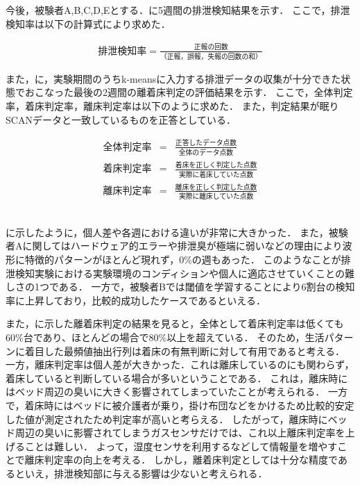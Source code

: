 今後，被験者A,B,C,D,Eとする．に5週間の排泄検知結果を示す．
ここで，排泄検知率は以下の計算式により求めた．

\begin{eqnarray}
  \mbox{排泄検知率}=\frac{\mbox{正報の回数}}{\mbox{（正報，誤報，失報の回数の和）}} \label{exec}
\end{eqnarray}
\par

また，に，実験期間のうちk-meansに入力する排泄データの収集が十分できた状態でおこなった最後の2週間の離着床判定の評価結果を示す．
ここで，全体判定率，着床判定率，離床判定率は以下のように求めた．
また，判定結果が眠りSCANデータと一致しているものを正答としている．

\begin{eqnarray}
  \mbox{全体判定率}&=&\frac{\mbox{正答したデータ点数}}{\mbox{全体のデータ点数}} \label{all}\\
  \mbox{着床判定率}&=&\frac{\mbox{着床を正しく判定した点数}}{\mbox{実際に着床していた点数}} \label{bedin}\\
  \mbox{離床判定率}&=&\frac{\mbox{離床を正しく判定した点数}}{\mbox{実際に離床していた点数}} \label{bedout}
\end{eqnarray}
　\par

に示したように，個人差や各週における違いが非常に大きかった．
また，被験者Aに関してはハードウェア的エラーや排泄臭が極端に弱いなどの理由により波形に特徴的パターンがほとんど現れず，0\%の週もあった．
このようなことが排泄検知実験における実験環境のコンディションや個人に適応させていくことの難しさの1つである．
一方で，被験者Bでは閾値を学習することにより6割台の検知率に上昇しており，比較的成功したケースであるといえる．

また，に示した離着床判定の結果を見ると，全体として着床判定率は低くても60\%台であり、ほとんどの場合で80\%以上を超えている．
そのため，生活パターンに着目した最頻値抽出行列は着床の有無判断に対して有用であると考える．
一方，離床判定率は個人差が大きかった．これは離床しているのにも関わらず，着床していると判断している場合が多いということである．
これは，離床時にはベッド周辺の臭いに大きく影響されてしまっていたことが考えられる．
一方で，着床時にはベッドに被介護者が乗り，掛け布団などをかけるため比較的安定した値が測定されたため判定率が高いと考らえる．
したがって，離床時にベッド周辺の臭いに影響されてしまうガスセンサだけでは、これ以上離床判定率を上げることは難しい．
よって，湿度センサを利用するなどして情報量を増やすことで離床判定率の向上を考える．
しかし，離着床判定としては十分な精度であるといえ，排泄検知部に与える影響は少ないと考えられる．


